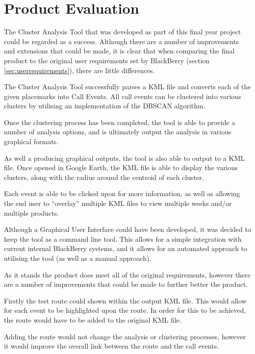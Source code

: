 \section{Product Evaluation}
\label{sec:product_evaluation}

The Cluster Analysis Tool that was developed as part of this final year project
could be regarded as a success. Although there are a number of improvements and
extensions that could be made, it is clear that when comparing the final 
product to the original user requirements set by BlackBerry (section 
\ref{sec:userrequirements}), there are little differences.

The Cluster Analysis Tool successfully parses a KML file and converts each of 
the given placemarks into Call Events. All call events can be clustered into 
various clusters by utilising an implementation of the DBSCAN algorithm.

Once the clustering process has been completed, the tool is able to provide a 
number of analysis options, and is ultimately output the analysis in various 
graphical formats.

As well a producing graphical outputs, the tool is also able to output to a 
KML file. Once opened in Google Earth, the KML file is able to display the 
various clusters, along with the radius around the centroid of each cluster. 

Each event is able to be clicked upon for more information, as well as allowing
the end user to ``overlay'' multiple KML files to view multiple weeks and/or 
multiple products.

Although a Graphical User Interface could have been developed, it was decided 
to keep the tool as a command line tool. This allows for a simple integration
with current internal BlackBerry systems, and it allows for an automated 
approach to utilising the tool (as well as a manual approach).

As it stands the product does meet all of the original requirements, however 
there are a number of improvements that could be made to further better the 
product.

Firstly the test route could shown within the output KML file. This would allow
for each event to be highlighted upon the route. In order for this to be 
achieved, the route would have to be added to the original KML file. 

Adding the route would not change the analysis or clustering processes, however
it would improve the overall link between the route and the call events.


